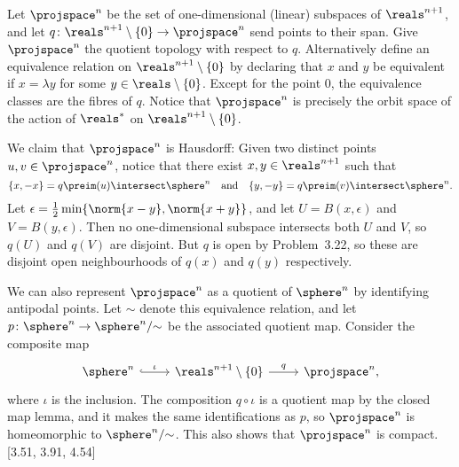 \documentclass[article, a4paper, 11pt, oneside]{memoir}
\numberwithin{equation}{chapter}
\begin{document}
\begin{example}
    Let $\projspace^n$ be the set of one-dimensional (linear) subspaces of $\reals^{n+1}$, and let $q \colon \reals^{n+1} \setminus \{0\} \to \projspace^n$ send points to their span. Give $\projspace^n$ the quotient topology with respect to $q$. Alternatively define an equivalence relation on $\reals^{n+1} \setminus \{0\}$ by declaring that $x$ and $y$ be equivalent if $x = \lambda y$ for some $y \in \reals \setminus \{0\}$. Except for the point $0$, the equivalence classes are the fibres of $q$. Notice that $\projspace^n$ is precisely the orbit space of the action of $\reals^*$ on $\reals^{n+1} \setminus \{0\}$.
    
    We claim that $\projspace^n$ is Hausdorff: Given two distinct points $u,v \in \projspace^n$, notice that there exist $x,y \in \reals^{n+1}$ such that
    \begin{equation*}
        \{x,-x\}
            = q\preim(u) \intersect \sphere^n
        \quad \text{and} \quad
        \{y,-y\}
            = q\preim(v) \intersect \sphere^n.
    \end{equation*}
    Let $\epsilon = \tfrac{1}{2} \min \{\norm{x-y}, \norm{x+y}\}$, and let $U = B(x,\epsilon)$ and $V = B(y,\epsilon)$. Then no one-dimensional subspace intersects both $U$ and $V$, so $q(U)$ and $q(V)$ are disjoint. But $q$ is open by Problem~3.22, so these are disjoint open neighbourhoods of $q(x)$ and $q(y)$ respectively.

    We can also represent $\projspace^n$ as a quotient of $\sphere^n$ by identifying antipodal points. Let $\sim$ denote this equivalence relation, and let $p \colon \sphere^n \to \sphere^n/{\sim}$ be the associated quotient map. Consider the composite map
    \begin{equation*}
        \begin{tikzcd}
            \sphere^n
                \ar[r, hook, "\iota"]
            & \reals^{n+1} \setminus \{0\}
                \ar[r, "q"]
            & \projspace^n,
        \end{tikzcd}
    \end{equation*}
    where $\iota$ is the inclusion. The composition $q \circ \iota$ is a quotient map by the closed map lemma, and it makes the same identifications as $p$, so $\projspace^n$ is homeomorphic to $\sphere^n/{\sim}$. This also shows that $\projspace^n$ is compact. [3.51, 3.91, 4.54]
\end{example}
\end{document}

